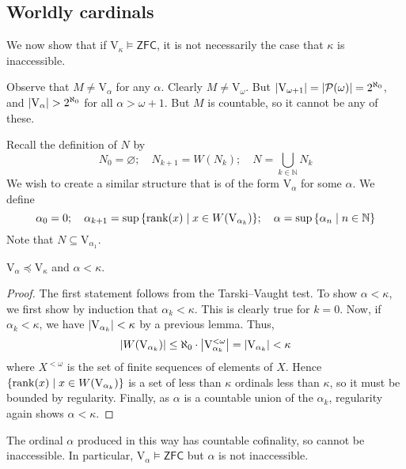 \subsection{Worldly cardinals}
We now show that if \( \mathrm{V}_\kappa \vDash \mathsf{ZFC} \), it is not necessarily the case that \( \kappa \) is inaccessible.

Observe that \( M \neq \mathrm{V}_\alpha \) for any \( \alpha \).
Clearly \( M \neq \mathrm{V}_\omega \).
But \( \abs{\mathrm{V}_{\omega + 1}} = \abs{\mathcal P(\omega)} = 2^{\aleph_0} \), and \( \abs{\mathrm{V}_\alpha} > 2^{\aleph_0} \) for all \( \alpha > \omega + 1 \).
But \( M \) is countable, so it cannot be any of these.

Recall the definition of \( N \) by
\[ N_0 = \varnothing;\quad N_{k+1} = W(N_k);\quad N = \bigcup_{k \in \mathbb N} N_k \]
We wish to create a similar structure that is of the form \( \mathrm{V}_\alpha \) for some \( \alpha \).
We define
\[ \alpha_0 = 0;\quad \alpha_{k+1} = \sup\qty{\rank(x) \mid x \in W(\mathrm{V}_{\alpha_k})};\quad \alpha = \sup\qty{\alpha_n \mid n \in \mathbb N} \]
Note that \( N \subseteq \mathrm{V}_{\alpha_1} \).
\begin{theorem}
    \( \mathrm{V}_\alpha \preceq \mathrm{V}_\kappa \) and \( \alpha < \kappa \).
\end{theorem}
\begin{proof}
    The first statement follows from the Tarski--Vaught test.
    To show \( \alpha < \kappa \), we first show by induction that \( \alpha_k < \kappa \).
    This is clearly true for \( k = 0 \).
    Now, if \( \alpha_k < \kappa \), we have \( \abs{\mathrm{V}_{\alpha_k}} < \kappa \) by a previous lemma.
    Thus,
    \[ \abs{W(\mathrm{V}_{\alpha_k})} \leq \aleph_0 \cdot \abs{\mathrm{V}_{\alpha_k}^{<\omega}} = \abs{\mathrm{V}_{\alpha_k}} < \kappa \]
    where \( X^{<\omega} \) is the set of finite sequences of elements of \( X \).
    Hence \( \qty{\rank(x) \mid x \in W(\mathrm{V}_{\alpha_k})} \) is a set of less than \( \kappa \) ordinals less than \( \kappa \), so it must be bounded by regularity.
    Finally, as \( \alpha \) is a countable union of the \( \alpha_k \), regularity again shows \( \alpha < \kappa \).
\end{proof}
\begin{remark}
    The ordinal \( \alpha \) produced in this way has countable cofinality, so cannot be inaccessible.
    In particular, \( \mathrm{V}_\alpha \vDash \mathsf{ZFC} \) but \( \alpha \) is not inaccessible.
\end{remark}

